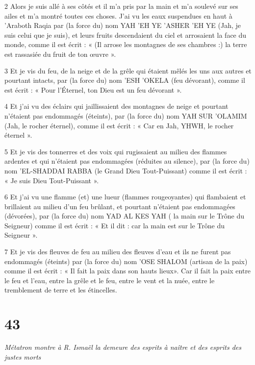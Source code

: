 \par 2 Alors je suis allé à ses côtés et il m'a pris par la main et m'a soulevé sur ses ailes et m'a montré toutes ces choses. J'ai vu les eaux suspendues en haut à 'Araboth Raqia par (la force du) nom YAH 'EH YE 'ASHER 'EH YE (Jah, je suis celui que je suis), et leurs fruits descendaient du ciel et arrosaient la face du monde, comme il est écrit : « (Il arrose les montagnes de ses chambres :) la terre est rassasiée du fruit de ton œuvre ».

\par 3 Et je vis du feu, de la neige et de la grêle qui étaient mêlés les uns aux autres et pourtant intacts, par (la force du) nom 'ESH 'OKELA (feu dévorant), comme il est écrit : « Pour l'Éternel, ton Dieu est un feu dévorant ».

\par 4 Et j'ai vu des éclairs qui jaillissaient des montagnes de neige et pourtant n'étaient pas endommagés (éteints), par (la force du) nom YAH SUR 'OLAMIM (Jah, le rocher éternel), comme il est écrit : « Car en Jah, YHWH, le rocher éternel ».

\par 5 Et je vis des tonnerres et des voix qui rugissaient au milieu des flammes ardentes et qui n'étaient pas endommagées (réduites au silence), par (la force du) nom 'EL-SHADDAI RABBA (le Grand Dieu Tout-Puissant) comme il est écrit : « Je suis Dieu Tout-Puissant ».

\par 6 Et j'ai vu une flamme (et) une lueur (flammes rougeoyantes) qui flambaient et brillaient au milieu d'un feu brûlant, et pourtant n'étaient pas endommagées (dévorées), par (la force du) nom YAD AL KES YAH ( la main sur le Trône du Seigneur) comme il est écrit : « Et il dit : car la main est sur le Trône du Seigneur ».

\par 7 Et je vis des fleuves de feu au milieu des fleuves d'eau et ils ne furent pas endommagés (éteints) par (la force du) nom 'OSE SHALOM (artisan de la paix) comme il est écrit : « Il fait la paix dans son hauts lieux». Car il fait la paix entre le feu et l'eau, entre la grêle et le feu, entre le vent et la nuée, entre le tremblement de terre et les étincelles.

\chapter{43}

\par \textit{Métatron montre à R. Ismaël la demeure des esprits à naître et des esprits des justes morts}

